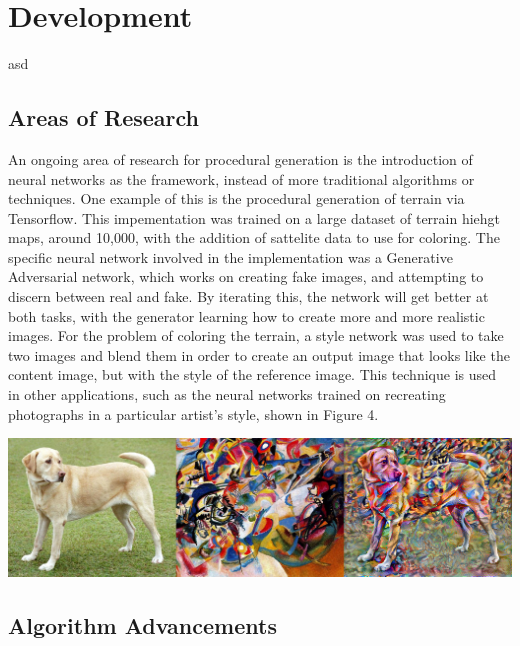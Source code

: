 \documentclass[10pt]{report}
\begin{document}
	\vspace{10pt}
	\let\clearpage\relax
	\chapter{Development}
		asd

		\section{Areas of Research}
	
		An ongoing area of research for procedural generation is the introduction of neural networks as the framework, instead of more traditional algorithms or techniques. One example of this is the procedural generation of terrain via Tensorflow. This impementation was trained on a large dataset of terrain hiehgt maps, around 10,000, with the addition of sattelite data to use for coloring. The specific neural network involved in the implementation was a Generative Adversarial network, which works on creating fake images, and attempting to discern between real and fake. By iterating this, the network will get better at both tasks, with the generator learning how to create more and more realistic images. For the problem of coloring the terrain, a style network was used to take two images and blend them in order to create an output image that looks like the content image, but with the style of the reference image. This technique is used in other applications, such as the neural networks trained on recreating photographs in a particular artist's style, shown in Figure 4. 
		
		\begin{minipage}{\textwidth}
			\centering
			\includegraphics[scale=.3]{stylized-image}
			\label{fig:fig5}
		\end{minipage}
	
		
		
		\cite{Liu_2020}
		
		\section{Algorithm Advancements}
		
\end{document}
